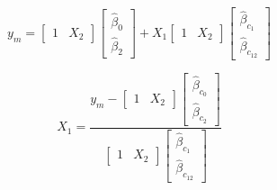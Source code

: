 \documentclass[../../paper.tex]{subfiles}
\begin{document}
\begin{equation}
  y_{m} =
  \begin{bmatrix}
    1 & X_{2}
  \end{bmatrix}
  \begin{bmatrix}
    \hat{\beta}_{0} \\
    \hat{\beta}_{2}
  \end{bmatrix} +
  X_{1}
  \begin{bmatrix}
    1 & X_{2}
  \end{bmatrix}
  \begin{bmatrix}
    \hat{\beta}_{c_1} \\
    \hat{\beta}_{c_{12}}
  \end{bmatrix}
\end{equation}

\begin{equation}
  X_{1} =
  \frac{
    y_{m} -
    \begin{bmatrix}
        1 & X_{2}
      \end{bmatrix}
      \begin{bmatrix}
        \hat{\beta}_{c_0} \\
        \hat{\beta}_{c_2}
      \end{bmatrix}
    }{
    \begin{bmatrix}
      1 & X_{2}
    \end{bmatrix}
    \begin{bmatrix}
      \hat{\beta}_{c_1} \\
      \hat{\beta}_{c_{12}}
    \end{bmatrix}
    }
\end{equation}
\end{document}
